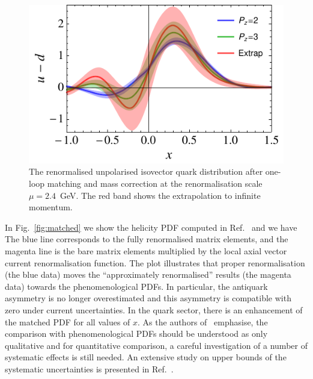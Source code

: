 %
%

\begin{figure}[t]
\centering
\includegraphics[width=.6\textwidth]{plots/pdf_nonorm}
\caption{\small The renormalised unpolarised isovector quark distribution after one-loop matching and mass correction at the renormalisation scale $\mu=2.4$~GeV. The red band shows the extrapolation to infinite momentum. 
} \label{fig:final_pdf}
\end{figure}

In Fig.~\ref{fig:matched} we show the helicity PDF computed in Ref.~\cite{Alexandrou:2017huk} and we have
The blue line corresponds to
the fully renormalised matrix elements, and the magenta line is the bare matrix elements multiplied by the local axial vector 
current renormalisation function. %
The plot illustrates that proper renormalisation (the blue data) moves the ``approximately renormalised'' results (the magenta data) towards the phenomenological PDFs. In particular, the antiquark asymmetry is no longer overestimated and this asymmetry is 
compatible with zero under current uncertainties. In the quark sector, there is an enhancement of the matched PDF for all 
values of $x$. As the authors of~\cite{Alexandrou:2017huk} emphasise, the comparison with phenomenological PDFs should be understood as only qualitative and for quantitative comparison, a careful investigation of a number of systematic effects is still needed. An extensive study 
on upper bounds of the systematic uncertainties is presented in Ref.~\cite{Alexandrou:2017huk}.

